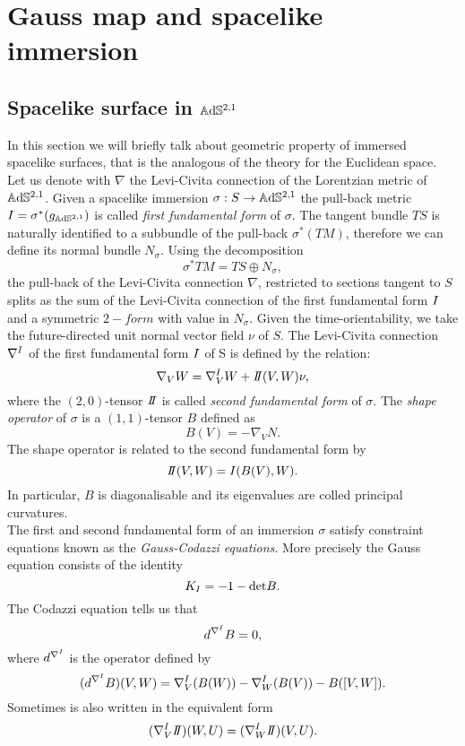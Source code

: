 \chapter{Gauss map and spacelike immersion}

\section{Spacelike surface in $\mathbb{A}\mathrm{d}\mathbb{S}^{2,1}$}
In this section we will briefly talk about geometric property of immersed spacelike surfaces, that is the analogous of the theory for the Euclidean space.\\
Let us denote with $\nabla$ the Levi-Civita connection of the Lorentzian metric of $\mathbb{A}\mathrm{d}\mathbb{S}^{2,1}$. Given a spacelike immersion $\sigma: S\to\mathbb{A}\mathrm{d}\mathbb{S}^{2,1}$ the pull-back metric $I = \sigma^*(g_{\mathbb{A}\mathrm{d}\mathbb{S}^{2,1}})$ is called \textit{first fundamental form} of $\sigma$.
The tangent bundle $TS$ is naturally identified to a subbundle of the pull-back $\sigma^*(TM)$, therefore we can define its normal bundle $N_\sigma$. Using the decomposition
\[
    \sigma^* TM = TS \oplus N_\sigma,
\]
the pull-back of the Levi-Civita connection $\nabla$, restricted to sections tangent to $S$ splits as the sum of the Levi-Civita connection of the first fundamental form $I$ and a symmetric $2-form$ with value in $N_\sigma$. Given the time-orientability, we take the future-directed unit normal vector field $\nu$ of $S$. The Levi-Civita connection $\nabla^I$ of the first fundamental form $I$ of S is defined by the relation:
\[
    \nabla_V W= \nabla^\I_V W + \II(V,W)\nu,
\] 
where the $(2,0)$-tensor $\II$ is called \textit{second fundamental form} of $\sigma$. The \textit{shape  operator} of $\sigma$ is a $(1,1)$-tensor $B$ defined as
\[
    B(V) = - \nabla_V N.
\]
The shape operator is related to the second fundamental form by
\[
    \II(V,W) = \I(B(V),W).
\]
In particular, $B$ is diagonalisable and its eigenvalues are colled principal curvatures.\\
The first and second fundamental form of an immersion $\sigma$ satisfy constraint equations known as the \textit{Gauss-Codazzi equations}. More precisely the Gauss equation consists of the identity
\[
    K_I = -1 - \text{det}B.
\]
The Codazzi equation tells us that
\[
    d^{\nabla^I}B=0,
\]
where $d^{\nabla^I}$ is the operator defined by
\[
    (d^{\nabla^I}B)(V,W) = \nabla^I_V(B(W)) - \nabla^I_W(B(V)) - B([V,W]).
\]
Sometimes is also written in the equivalent form 
\[
    (\nabla^\I_V \II)(W,U) = (\nabla^\I_W \II)(V,U).
\]
